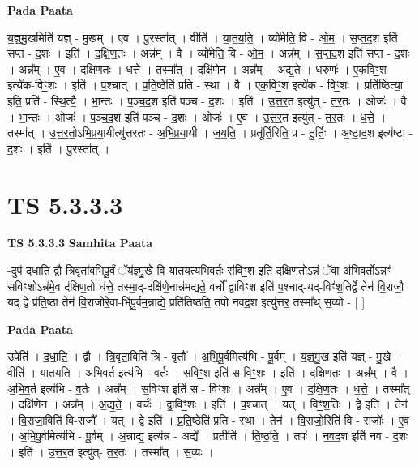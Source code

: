 \documentclass[17pt]{extarticle}
\begin{document}
\textbf{Pada Paata} \newline

य॒ज्ञ्॒मु॒खमिति॑ यज्ञ् - मु॒खम् । ए॒व । पु॒रस्ता᳚त् । वीति॑ । या॒त॒य॒ति॒ । व्यो॑मेति॒ वि - ओ॒म॒ । स॒प्त॒द॒श इति॑ सप्त - द॒शः । इति॑ । द॒क्षि॒ण॒तः । अन्न᳚म् । वै । व्यो॑मेति॒ वि - ओ॒म॒ । अन्न᳚म् । स॒प्त॒द॒श इति॑ सप्त - द॒शः । अन्न᳚म् । ए॒व । द॒क्षि॒ण॒तः । ध॒त्ते॒ । तस्मा᳚त् । दक्षि॑णेन । अन्न᳚म् । अ॒द्य॒ते॒ । ध॒रुणः॑ । ए॒क॒विꣳ॒॒श इत्ये॑क-विꣳ॒॒शः । इति॑ । प॒श्चात् । प्र॒ति॒ष्ठेति॑ प्रति - स्था । वै । ए॒क॒विꣳ॒॒श इत्ये॑क - विꣳ॒॒शः । प्रति॑ष्ठित्या॒ इति॒ प्रति॑ - स्थि॒त्यै॒ । भा॒न्तः । प॒ञ्च॒द॒श इति॑ पञ्च - द॒शः । इति॑ । उ॒त्त॒र॒त इत्यु॑त् - त॒र॒तः । ओजः॑ । वै । भा॒न्तः । ओजः॑ । प॒ञ्च॒द॒श इति॑ पञ्च - द॒शः । ओजः॑ । ए॒व । उ॒त्त॒र॒त इत्यु॑त् - त॒र॒तः । ध॒त्ते॒ । तस्मा᳚त् । उ॒त्त॒र॒तो॒ऽभि॒प्र॒या॒यीत्यु॑त्तरतः - अ॒भि॒प्र॒या॒यी । ज॒य॒ति॒ । प्रतू᳚र्ति॒रिति॒ प्र - तू॒र्तिः॒ । अ॒ष्टा॒द॒श इत्य॑ष्टा - द॒शः । इति॑ । पु॒रस्ता᳚त् ।  \newline




\section*{ TS 5.3.3.3 }

\textbf{TS 5.3.3.3 } \newline
\textbf{Samhita Paata} \newline

-दुप॑ दधाति॒ द्वौ त्रि॒वृता॑वभिपू॒र्वं ॅय॑ज्ञ्मु॒खे वि या॑तयत्यभिव॒र्तः स॑विꣳ॒॒श इति॑ दक्षिण॒तोऽन्नं॒ ॅवा अ॑भिव॒र्तोऽन्नꣳ॑ सविꣳ॒॒शोऽन्न॑मे॒व द॑क्षिण॒तो ध॑त्ते॒ तस्मा॒द्-दक्षि॑णे॒नान्न॑मद्यते॒ वर्चो᳚ द्वाविꣳ॒॒श इति॑ प॒श्चाद्-यद्-विꣳ॑श॒तिर्द्वे तेन॑ वि॒राजौ॒ यद् द्वे प्र॑ति॒ष्ठा तेन॑ वि॒राजो॑रे॒वा-भि॑पू॒र्वम॒न्नाद्ये॒ प्रति॑तिष्ठति॒ तपो॑ नवद॒श इत्यु॑त्तर॒ तस्मा᳚थ् स॒व्यो - [  ] \newline

\textbf{Pada Paata} \newline

उपेति॑ । द॒धा॒ति॒ । द्वौ । त्रि॒वृता॒विति॑ त्रि - वृतौ᳚ । अ॒भि॒पू॒र्वमित्य॑भि - पू॒र्वम् । य॒ज्ञ्॒मु॒ख इति॑ यज्ञ् - मु॒खे । वीति॑ । या॒त॒य॒ति॒ । अ॒भि॒व॒र्त इत्य॑भि - व॒र्तः । स॒विꣳ॒॒श इति॑ स-विꣳ॒॒शः । इति॑ । द॒क्षि॒ण॒तः । अन्न᳚म् । वै । अ॒भि॒व॒र्त इत्य॑भि - व॒र्तः । अन्न᳚म् । स॒विꣳ॒॒श इति॑ स - विꣳ॒॒शः । अन्न᳚म् । ए॒व । द॒क्षि॒ण॒तः । ध॒त्ते॒ । तस्मा᳚त् । दक्षि॑णेन । अन्न᳚म् । अ॒द्य॒ते॒ । वर्चः॑ । द्वा॒विꣳ॒॒शः । इति॑ । प॒श्चात् । यत् । विꣳ॒॒श॒तिः । द्वे इति॑ । तेन॑ । वि॒राजा॒विति॑ वि-राजौ᳚ । यत् । द्वे इति॑ । प्र॒ति॒ष्ठेति॑ प्रति - स्था । तेन॑ । वि॒राजो॒रिति॑ वि - राजोः᳚ । ए॒व । अ॒भि॒पू॒र्वमित्य॑भि - पू॒र्वम् । अ॒न्नाद्य॒ इत्य॑न्न - अद्ये᳚ । प्रतीति॑ । ति॒ष्ठ॒ति॒ । तपः॑ । न॒व॒द॒श इति॑ नव - द॒शः । इति॑ । उ॒त्त॒र॒त इत्यु॑त्- त॒र॒तः । तस्मा᳚त् । स॒व्यः ।  \newline
\end{document}
